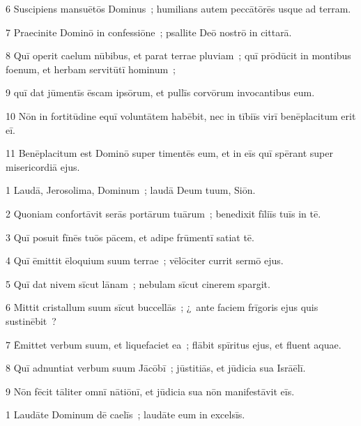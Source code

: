 \psalmVerse
  {\phantom{00}6}
  {Suscipiens mansuētōs Dominus~; humilians autem peccātōrēs usque ad terram.}


\psalmVerse
  {\phantom{00}7}
  {Praecinite Dominō in confessiōne~; psallite Deō nostrō in cittarā.}


\psalmVerse
  {\phantom{00}8}
  {Quī operit caelum nūbibus, et parat terrae pluviam~; quī prōdūcit in montibus foenum, et herbam servitūtī hominum~;}


\psalmVerse
  {\phantom{00}9}
  {quī dat jūmentīs ēscam ipsōrum, et pullīs corvōrum invocantibus eum.}


\psalmVerse
  {\phantom{0}10}
  {Nōn in fortitūdine equī voluntātem habēbit, nec in tībiīs virī benēplacitum erit eī.}


\psalmVerse
  {\phantom{0}11}
  {Benēplacitum est Dominō super timentēs eum, et in eīs quī spērant super misericordiā ejus.}



\psalmVerse
  {\phantom{00}1}
  {Laudā, Jerosolima, Dominum~; laudā Deum tuum, Siōn.}


\psalmVerse
  {\phantom{00}2}
  {Quoniam confortāvit serās portārum tuārum~; benedixit fīliīs tuīs in tē.}


\psalmVerse
  {\phantom{00}3}
  {Quī posuit fīnēs tuōs pācem, et adipe frūmentī satiat tē.}


\psalmVerse
  {\phantom{00}4}
  {Quī ēmittit ēloquium suum terrae~; vēlōciter currit sermō ejus.}


\psalmVerse
  {\phantom{00}5}
  {Quī dat nivem sīcut lānam~; nebulam sīcut cinerem spargit.}


\psalmVerse
  {\phantom{00}6}
  {Mittit cristallum suum sīcut buccellās~; ¿~ante faciem frīgoris ejus quis sustinēbit~?}


\psalmVerse
  {\phantom{00}7}
  {Ēmittet verbum suum, et liquefaciet ea~; flābit spīritus ejus, et fluent aquae.}


\psalmVerse
  {\phantom{00}8}
  {Quī adnuntiat verbum suum Jācōbī~; jūstitiās, et jūdicia sua Isrāēlī.}


\psalmVerse
  {\phantom{00}9}
  {Nōn fēcit tāliter omnī nātiōnī, et jūdicia sua nōn manifestāvit eīs.}




\psalmVerse
  {\phantom{00}1}
  {Laudāte Dominum dē caelīs~; laudāte eum in excelsīs.}


